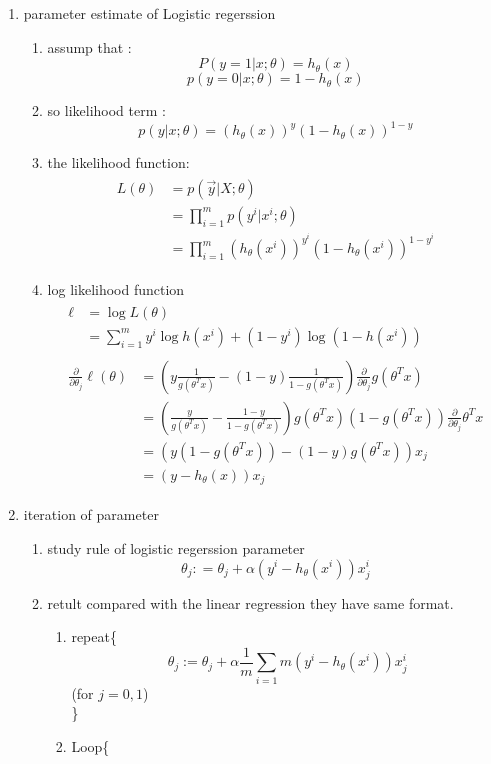\documentclass[12pt]{ctexart}%
\begin{document}
\begin{enumerate}
			\item parameter estimate of Logistic regerssion
				\begin{enumerate}
					\item assump that :
										$$P(y=1|x;\theta) = h_\theta(x)$$
										$$p(y=0|x;\theta) = 1 - h_\theta(x)$$
					\item so likelihood term : $$p(y|x;\theta) = (h_\theta(x))^{y} (1-h_\theta(x))^{1-y}$$
					\item the likelihood function:
						  \begin{align}
						  	  \begin{split}
						  	  	  L(\theta) &= p(\vec{y}|X;\theta)\\
						  	  	  			&= \prod_{i=1}^{m}p(y^i|x^i;\theta)\\
						  	  	  			&= \prod_{i=1}^{m}(h_\theta(x^i))^{y^i} (1-h_\theta(x^i))^{1-y^i}
						  	  \end{split}
						  \end{align}
					\item log likelihood function
					\begin{align}
						\begin{split}
							\ell &= \log{L(\theta)} \\
								 &= \sum_{i=1}^{m}y^i \log{h(x^i)} + (1-y^i)\log{(1 - h(x^i))}
						\end{split}\\
						\begin{split}
							\frac{\partial}{\partial \theta_j}\ell(\theta) 
							&= (y\frac{1}{g(\theta^T x)} - (1-y)\frac{1}{1-g(\theta^T x)}) \frac{\partial}{\partial\theta_j}g(\theta^T x)\\
							&= (\frac{y}{g(\theta^T x)} - \frac{1-y}{1-g(\theta^T x)}) g(\theta^T x)(1 - g(\theta^T x))\frac{\partial}{\partial\theta_j}\theta^T x\\
							&= (y(1-g(\theta^T x)) - (1-y)g(\theta^T x))x_j\\
							&= (y - h_\theta(x))x_j
						\end{split}
					\end{align}
				\end{enumerate}
			
			\item iteration of parameter
				\begin{enumerate}
					\item study rule of logistic regerssion parameter
						\begin{equation}
							\theta_j : = \theta_j + \alpha(y^i - h_\theta(x^i))x_j^i
						\end{equation}
					\item retult compared with the linear regression
						they have same format.
						\begin{enumerate}
							\item repeat\{
							$$\theta_j := \theta_j + \alpha\frac{1}{m}\sum_{i=1}{m}(y^i - h_\theta(x^i))x_j^i$$
							\qquad \qquad \qquad(for $j = 0,1$)\\
							\}
							\item 	Loop\{
							

\end{enumerate}
\end{enumerate}
\end{enumerate}
\end{document}
